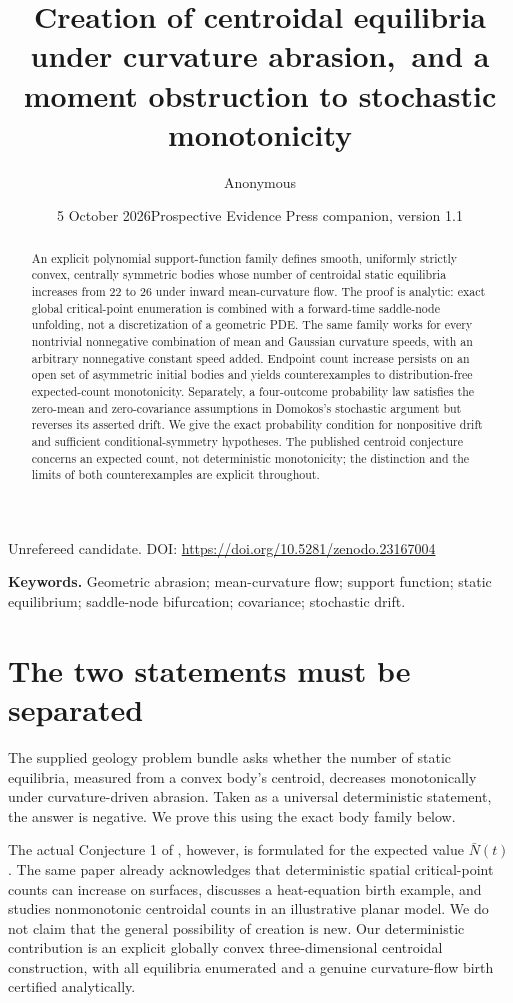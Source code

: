 \documentclass[11pt,a4paper]{article}
\title{Creation of centroidal equilibria under curvature abrasion,\ and a moment obstruction to stochastic monotonicity}
\author{Anonymous}
\date{5 October 2026\quad\textnormal{Prospective Evidence Press companion, version 1.1}}
\theoremstyle{remark}\newtheorem{remark}[theorem]{Remark}
\begin{document}
\maketitle
\begin{center}\small Unrefereed candidate. DOI: \url{https://doi.org/10.5281/zenodo.23167004}\end{center}
\begin{abstract}
An explicit polynomial support-function family defines smooth, uniformly strictly convex, centrally symmetric bodies whose number of centroidal static equilibria increases from 22 to 26 under inward mean-curvature flow. The proof is analytic: exact global critical-point enumeration is combined with a forward-time saddle-node unfolding, not a discretization of a geometric PDE. The same family works for every nontrivial nonnegative combination of mean and Gaussian curvature speeds, with an arbitrary nonnegative constant speed added. Endpoint count increase persists on an open set of asymmetric initial bodies and yields counterexamples to distribution-free expected-count monotonicity. Separately, a four-outcome probability law satisfies the zero-mean and zero-covariance assumptions in Domokos's stochastic argument but reverses its asserted drift. We give the exact probability condition for nonpositive drift and sufficient conditional-symmetry hypotheses. The published centroid conjecture concerns an expected count, not deterministic monotonicity; the distinction and the limits of both counterexamples are explicit throughout.
\end{abstract}
\noindent\textbf{Keywords.} Geometric abrasion; mean-curvature flow; support function; static equilibrium; saddle-node bifurcation; covariance; stochastic drift.

\section{The two statements must be separated}
The supplied geology problem bundle asks whether the number of static equilibria, measured from a convex body's centroid, decreases monotonically under curvature-driven abrasion. Taken as a universal deterministic statement, the answer is negative. We prove this using the exact body family below.

The actual Conjecture 1 of \citet{D15}, however, is formulated for the expected value \(\bar N(t)\). The same paper already acknowledges that deterministic spatial critical-point counts can increase on surfaces, discusses a heat-equation birth example, and studies nonmonotonic centroidal counts in an illustrative planar model. We do not claim that the general possibility of creation is new. Our deterministic contribution is an explicit globally convex three-dimensional centroidal construction, with all equilibria enumerated and a genuine curvature-flow birth certified analytically.
\end{document}
